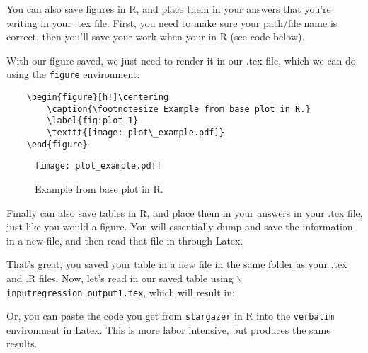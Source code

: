 \documentclass[12pt,letterpaper]{article}
\begin{document}
\noindent You can also save figures in R, and place them in your answers that you're writing in your .tex file. First, you need to make sure your path/file name is correct, then you'll save your work when your in R (see code below).

  
\vspace{.25cm}
\noindent With our figure saved, we just need to render it in our .tex file, which we can do using the \texttt{figure} environment:

\begin{verbatim}
	\begin{figure}[h!]\centering
		\caption{\footnotesize Example from base plot in R.}
		\label{fig:plot_1}
		\texttt{[image: plot\_example.pdf]}
	\end{figure}
\end{verbatim}

\begin{figure}[h!]\centering
	\caption{\footnotesize Example from base plot in R.}
	\label{fig:plot_1}
	\texttt{[image: plot\_example.pdf]}
\end{figure}

\noindent Finally can also save tables in R, and place them in your answers in your .tex file, just like you would a figure. You will essentially dump and save the information in a new file, and then read that file in through Latex.

  

\noindent That's great, you saved your table in a new file in the same folder as your .tex and .R files. Now, let's read in our saved table using \texttt{$\backslash$input{regression\_output1.tex}}, which will result in:



\noindent Or, you can paste the code you get from \texttt{stargazer} in R into the \texttt{verbatim} environment in Latex. This is more labor intensive, but produces the same results.
\end{document}
